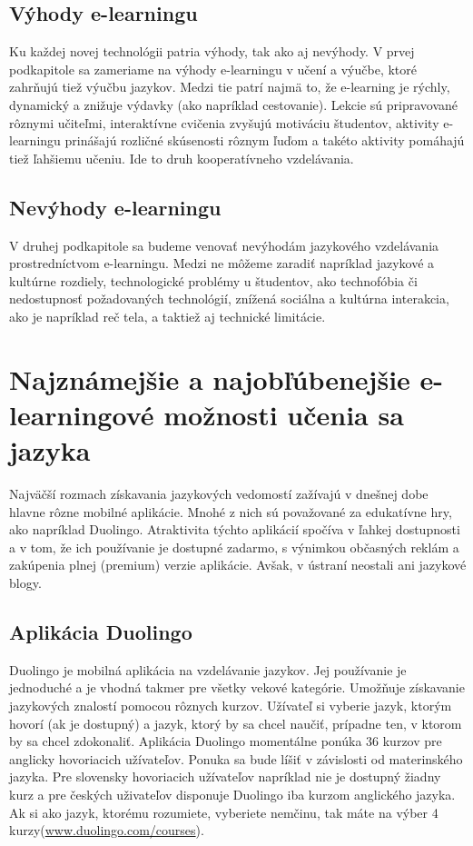 \documentclass[10pt,oneside,slovak,a4paper]{article}
\begin{document}
\subsection{Výhody e-learningu}%
Ku každej novej technológii patria výhody, tak ako aj nevýhody. V prvej podkapitole sa zameriame na výhody e-learningu v učení a výučbe, ktoré zahrňujú tiež výučbu jazykov. Medzi tie patrí najmä to, že e-learning je rýchly, dynamický a znižuje výdavky (ako napríklad cestovanie). \cite{efektivnost}
  Lekcie sú pripravované rôznymi učiteľmi, \cite{efektivnost}
 interaktívne cvičenia zvyšujú motiváciu študentov, \cite{vyhody}
 aktivity e-learningu prinášajú rozličné skúsenosti rôznym ľuďom a takéto aktivity pomáhajú tiež ľahšiemu učeniu. \cite{vyhody}
 Ide to druh kooperatívneho vzdelávania. \cite{efektivnost}

\subsection{Nevýhody e-learningu}%
V druhej podkapitole sa budeme venovať nevýhodám jazykového vzdelávania prostredníctvom e-learningu. Medzi ne môžeme zaradiť napríklad
 jazykové a kultúrne rozdiely, \cite{efektivnost}
 technologické problémy u študentov, ako technofóbia či  nedostupnosť požadovaných technológií, \cite{nevyhody}
 znížená sociálna a kultúrna interakcia, ako je napríklad reč tela,\cite{nevyhody} a taktiež aj 
 technické limitácie.\cite{efektivnost}


\section{Najznámejšie a najobľúbenejšie e-learningové možnosti učenia sa jazyka}%
\label{2}
Najväčší rozmach získavania jazykových vedomostí zažívajú v dnešnej dobe hlavne rôzne mobilné aplikácie. Mnohé z nich sú považované za edukatívne hry, ako napríklad Duolingo. Atraktivita týchto aplikácií spočíva v ľahkej dostupnosti a v tom, že ich používanie je dostupné zadarmo, s výnimkou občasných reklám a zakúpenia plnej (premium) verzie aplikácie. Avšak, v ústraní neostali ani jazykové blogy.

\subsection{Aplikácia Duolingo}%
Duolingo je mobilná aplikácia na vzdelávanie jazykov. Jej používanie je jednoduché a je vhodná takmer pre všetky vekové kategórie\cite{duolingo}. Umožňuje získavanie jazykových znalostí pomocou rôznych kurzov. Užívateľ si vyberie jazyk, ktorým hovorí (ak je dostupný) a jazyk, ktorý by sa chcel naučiť, prípadne ten, v ktorom by sa chcel zdokonaliť. Aplikácia Duolingo momentálne ponúka 36 kurzov pre anglicky hovoriacich užívateľov. Ponuka sa bude líšiť v závislosti od materinského jazyka. Pre slovensky hovoriacich užívateľov napríklad nie je dostupný žiadny kurz a pre českých uživateľov disponuje Duolingo iba kurzom anglického jazyka. Ak si ako jazyk, ktorému rozumiete, vyberiete nemčinu, tak máte na výber 4 kurzy(\href{https://www.duolingo.com/courses}{www.duolingo.com/courses}).
\end{document}
